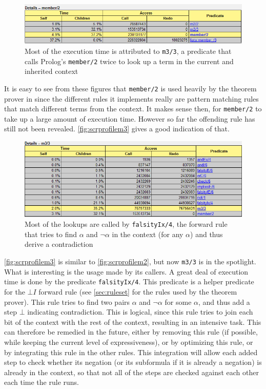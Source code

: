 \documentclass[11pt,twoside,a4paper]{report}
\begin{document}
\begin{figure}[htp]
\centerline{\includegraphics[scale=0.6]{img/scr-profile-member2.png}}
\caption{Most of the execution time is attributed to \lstinline$m3/3$, a predicate that calls Prolog's \lstinline$member/2$ twice to look up a term in the current and inherited context\label{fig:scrprofilem2}}
\end{figure}

It is easy to see from these figures that \lstinline$member/2$ is used heavily by the theorem prover in since the different rules it implements really are pattern matching rules that match different terms from the context. It makes sense then, for \lstinline$member/2$ to take up a large amount of execution time. However so far the offending rule has still not been revealed. \autoref{fig:scrprofilem3} gives a good indication of that.

\begin{figure}[htp]
\centerline{\includegraphics[scale=0.6]{img/scr-profile-member3.png}}
\caption{Most of the lookups are called by \lstinline$falsityIx/4$, the forward rule that tries to find $\alpha$ and $\neg\alpha$ in the context (for any $\alpha$) and thus derive a contradiction\label{fig:scrprofilem3}}
\end{figure}

\autoref{fig:scrprofilem3} is similar to \autoref{fig:scrprofilem2}, but now \lstinline$m3/3$ is in the spotlight. What is interesting is the usage made by its callers. A great deal of execution time is done by the predicate \lstinline$falsityIx/4$. This predicate is a helper predicate for the $\bot I$ forward rule (see \autoref{sec:ruleset} for the rules used by the theorem prover). This rule tries to find two pairs $\alpha$ and $\neg\alpha$ for some $\alpha$, and thus add a step $\bot$ indicating contradiction. This is logical, since this rule tries to join each bit of the context with the rest of the context, resulting in an intensive task. This can therefore be remedied in the future, either by removing this rule (if possible, while keeping the current level of expressiveness), or by optimizing this rule, or by integrating this rule in the other rules. This integration will allow each added step to check whether its negation (or its subformula if it is already a negation) is already in the context, so that not all of the steps are checked against each other each time the rule runs.
\end{document}
